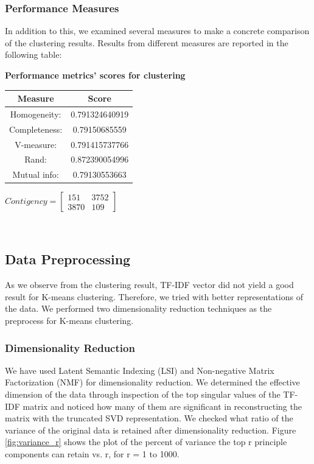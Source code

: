 \documentclass{report}
\begin{document}
\subsubsection*{Performance Measures}
In addition to this, we examined several measures to make a concrete comparison of the clustering results. Results from different measures are reported in the following table: 

\begin{center}
	\textbf{Performance metrics' scores for clustering}	\\ \vspace{10pt}
	\begin{tabular}{*{2}{c}}
		\toprule
		\textbf{Measure} & \textbf{Score}  \\
		\midrule
		Homogeneity: & 0.791324640919  \\
		\midrule
		Completeness: & 0.79150685559   \\
		\midrule
		V-measure: & 0.791415737766   \\
		\midrule
		Rand: & 0.872390054996   \\
		\midrule
		Mutual info: & 0.79130553663  \\
		\bottomrule
	\end{tabular}
	\qquad
	$Contigency = \left[\begin{array}{*{2}{c}}
    				151 & 3752 \\
     				3870 & 109
					\end{array}\right]
					$
\end{center}    

\\  \vspace{20pt}



\subsection*{Data Preprocessing}
As we observe from the clustering result, TF\--IDF vector did not yield a good result for K-means clustering. Therefore, we tried with better representations of the data. We performed two dimensionality reduction techniques as the preprocess for K-means clustering. \\ \vspace{10pt}


\subsubsection{Dimensionality Reduction}
We have used Latent Semantic Indexing (LSI) and Non-negative Matrix Factorization (NMF) for dimensionality reduction. 
We determined the effective dimension of the data through inspection of the top singular values of the TF\--IDF matrix and noticed how many of them are significant in reconstructing the matrix with the truncated SVD representation. We checked what ratio of the variance of the original data is retained after dimensionality reduction. Figure \ref{fig:variance_r} shows the plot of the percent of variance the top r principle components can retain vs. r, for r = 1 to 1000.
\end{document}
